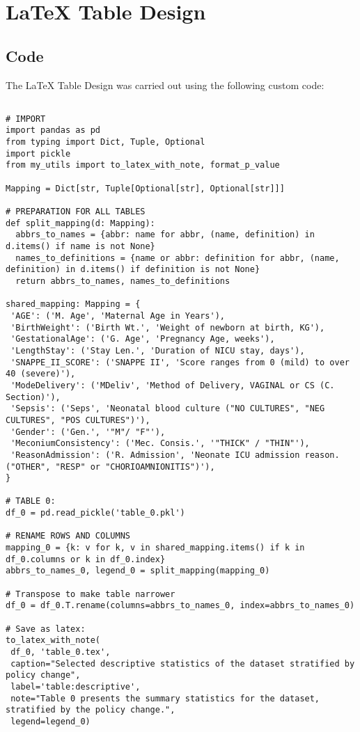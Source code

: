 \documentclass[11pt]{article}
\begin{document}
\section{LaTeX Table Design} \subsection{Code}The LaTeX Table Design was carried out using the following custom code:

\begin{verbatim}

# IMPORT
import pandas as pd
from typing import Dict, Tuple, Optional
import pickle
from my_utils import to_latex_with_note, format_p_value

Mapping = Dict[str, Tuple[Optional[str], Optional[str]]]

# PREPARATION FOR ALL TABLES
def split_mapping(d: Mapping):
  abbrs_to_names = {abbr: name for abbr, (name, definition) in d.items() if name is not None}
  names_to_definitions = {name or abbr: definition for abbr, (name, definition) in d.items() if definition is not None}
  return abbrs_to_names, names_to_definitions

shared_mapping: Mapping = {
 'AGE': ('M. Age', 'Maternal Age in Years'),
 'BirthWeight': ('Birth Wt.', 'Weight of newborn at birth, KG'),
 'GestationalAge': ('G. Age', 'Pregnancy Age, weeks'),
 'LengthStay': ('Stay Len.', 'Duration of NICU stay, days'),
 'SNAPPE_II_SCORE': ('SNAPPE II', 'Score ranges from 0 (mild) to over 40 (severe)'),
 'ModeDelivery': ('MDeliv', 'Method of Delivery, VAGINAL or CS (C. Section)'),
 'Sepsis': ('Seps', 'Neonatal blood culture ("NO CULTURES", "NEG CULTURES", "POS CULTURES")'),
 'Gender': ('Gen.', '"M"/ "F"'),
 'MeconiumConsistency': ('Mec. Consis.', '"THICK" / "THIN"'),
 'ReasonAdmission': ('R. Admission', 'Neonate ICU admission reason. ("OTHER", "RESP" or "CHORIOAMNIONITIS")'),
}

# TABLE 0:
df_0 = pd.read_pickle('table_0.pkl')

# RENAME ROWS AND COLUMNS
mapping_0 = {k: v for k, v in shared_mapping.items() if k in df_0.columns or k in df_0.index}
abbrs_to_names_0, legend_0 = split_mapping(mapping_0)

# Transpose to make table narrower
df_0 = df_0.T.rename(columns=abbrs_to_names_0, index=abbrs_to_names_0)

# Save as latex:
to_latex_with_note(
 df_0, 'table_0.tex',
 caption="Selected descriptive statistics of the dataset stratified by policy change", 
 label='table:descriptive',
 note="Table 0 presents the summary statistics for the dataset, stratified by the policy change.",
 legend=legend_0)


\end{verbatim}
\end{document}
